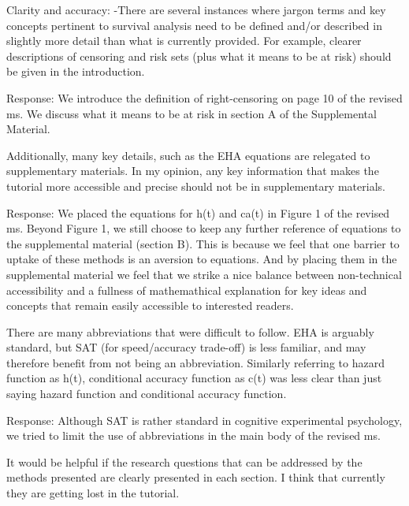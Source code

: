 \documentclass[
]{article}
\renewenvironment{quote}{\begin{leftbar}}{\end{leftbar}}
\begin{document}
\begin{quote}
Clarity and accuracy: -There are several instances where jargon terms
and key concepts pertinent to survival analysis need to be defined
and/or described in slightly more detail than what is currently
provided. For example, clearer descriptions of censoring and risk sets
(plus what it means to be at risk) should be given in the introduction.
\end{quote}

Response: We introduce the definition of right-censoring on page 10 of
the revised ms. We discuss what it means to be at risk in section A of
the Supplemental Material.

\begin{quote}
Additionally, many key details, such as the EHA equations are relegated
to supplementary materials. In my opinion, any key information that
makes the tutorial more accessible and precise should not be in
supplementary materials.
\end{quote}

Response: We placed the equations for h(t) and ca(t) in Figure 1 of the
revised ms. Beyond Figure 1, we still choose to keep any further
reference of equations to the supplemental material (section B). This is
because we feel that one barrier to uptake of these methods is an
aversion to equations. And by placing them in the supplemental material
we feel that we strike a nice balance between non-technical
accessibility and a fullness of mathemathical explanation for key ideas
and concepts that remain easily accessible to interested readers.

\begin{quote}
There are many abbreviations that were difficult to follow. EHA is
arguably standard, but SAT (for speed/accuracy trade-off) is less
familiar, and may therefore benefit from not being an abbreviation.
Similarly referring to hazard function as h(t), conditional accuracy
function as c(t) was less clear than just saying hazard function and
conditional accuracy function.
\end{quote}

Response: Although SAT is rather standard in cognitive experimental
psychology, we tried to limit the use of abbreviations in the main body
of the revised ms.

\begin{quote}
It would be helpful if the research questions that can be addressed by
the methods presented are clearly presented in each section. I think
that currently they are getting lost in the tutorial.
\end{quote}
\end{document}
